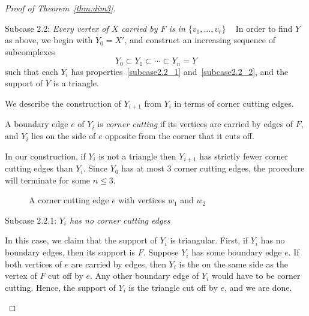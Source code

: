 \documentclass[ALCO,ThmDefs,Unicode,epreuves]{cedram}
\newenvironment{proofsection}[2]{\begin{enonce*}[remark]{#1 \emph{#2}} \ }{\end{enonce*}}
\begin{document}
\begin{proof}[Proof of Theorem~\ref{thm:dim3}]
\begin{proofsection}{Subcase 2.2:}{Every vertex of $X$ carried by $F$ is in $\{v_1, \ldots, v_r\}$}
In order to find $Y$ as above, we begin with $Y_0=X'$, and construct an increasing sequence of subcomplexes
\[
Y_0 \subset Y_1 \subset \cdots \subset Y_n = Y
\] 
such that each $Y_i$ has properties~\eqref{subcase2.2_1} and~\eqref{subcase2.2_2}, and the support of $Y$ is a triangle.

We describe the construction of $Y_{i+1}$ from $Y_{i}$ in terms of corner cutting edges.
\end{proofsection}

\begin{defi}
A boundary edge $e$ of $Y_i$ is \emph{corner cutting} if its vertices are carried by edges of $F$, and $Y_i$ lies on the side of $e$ opposite from the corner that it cuts off.
\end{defi}

In our construction, if $Y_i$ is not a triangle then $Y_{i+1}$ has strictly fewer corner cutting edges than $Y_i$. Since $Y_0$ has at most $3$ corner cutting edges, the procedure will terminate for some $n \leq 3$.

\begin{figure}[htb]\centering
\vspace*{-2mm}



\vspace*{-2mm}
\caption{A corner cutting edge $e$ with vertices $w_1$ and $w_2$}
\label{fig:ccedge}

\vspace*{-2mm}
\end{figure}


\begin{proofsection}{Subcase 2.2.1:}{$Y_i$ has no corner cutting edges} 

In this case, we claim that the support of $Y_i$ is triangular. First, if $Y_i$ has no boundary edges, then its support is $F$. Suppose $Y_i$ has some boundary edge $e$. If both vertices of $e$ are carried by edges, then $Y_i$ is the on the same side as the vertex of $F$ cut off by $e$. Any other boundary edge of $Y_i$ would have to be corner cutting. Hence, the support of $Y_i$ is the triangle cut off by $e$, and we are done.


\end{proofsection}
\end{proof}
\end{document}
